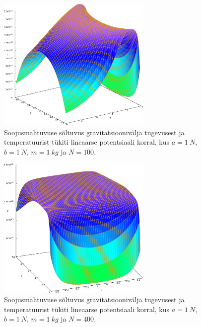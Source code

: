 \documentclass{trkut}%
\begin{document}
\begin{figure}[htb!]
    \includegraphics[width=0.66\textwidth]{maxima/m1a1b1T0_10S100.pdf}
    \caption{Soojusmahtuvuse sõltuvus gravitatsioonivälja tugevusest ja temperatuurist tükiti lineaarse potentsiaali korral, kus $a=\SI{1}{N}$, $b=\SI{1}{N}$, $m=\SI{1}{kg}$ ja $N=100$.}
    \label{joon3}
\end{figure}

\begin{figure}[htb!]
    \includegraphics[width=0.66\textwidth]{maxima/m1a1b1T0_10S400.pdf}
    \caption{Soojusmahtuvuse sõltuvus gravitatsioonivälja tugevusest ja temperatuurist tükiti lineaarse potentsiaali korral, kus $a=\SI{1}{N}$, $b=\SI{1}{N}$, $m=\SI{1}{kg}$ ja $N=400$.}
    \label{joon4}
\end{figure}

\end{document}
